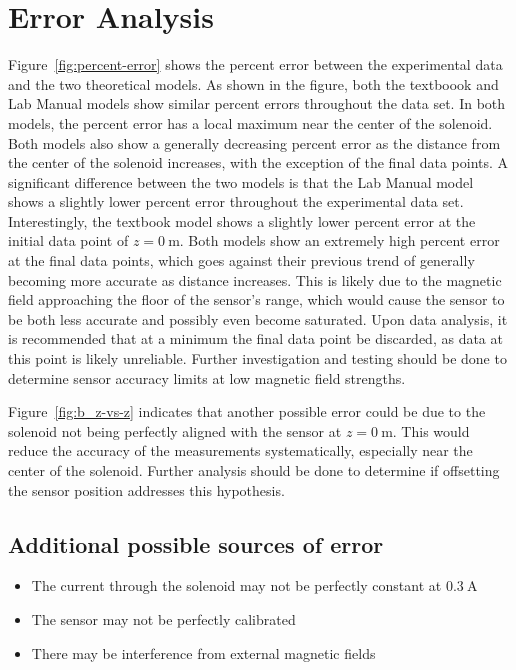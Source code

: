 \documentclass[11pt]{article}
\begin{document}
\section{Error Analysis}
Figure~\ref{fig:percent-error} shows the percent error between the experimental data and the two theoretical models.
As shown in the figure, both the textboook and Lab Manual models show similar percent errors throughout the data set.
In both models, the percent error has a local maximum near the center of the solenoid.
Both models also show a generally decreasing percent error as the distance from the center of the solenoid increases, with the exception of the final data points.
A significant difference between the two models is that the Lab Manual model shows a slightly lower percent error throughout the experimental data set.
Interestingly, the textbook model shows a slightly lower percent error at the initial data point of $z=\SI{0}{\meter}$.
Both models show an extremely high percent error at the final data points, which goes against their previous trend of generally becoming more accurate as distance increases.
This is likely due to the magnetic field approaching the floor of the sensor's range, which would cause the sensor to be both less accurate and possibly even become saturated.
Upon data analysis, it is recommended that at a minimum the final data point be discarded, as data at this point is likely unreliable.
Further investigation and testing should be done to determine sensor accuracy limits at low magnetic field strengths.

Figure~\ref{fig:b_z-vs-z} indicates that another possible error could be due to the solenoid not being perfectly aligned with the sensor at $z=\SI{0}{\meter}$.
This would reduce the accuracy of the measurements systematically, especially near the center of the solenoid.
Further analysis should be done to determine if offsetting the sensor position addresses this hypothesis.

\subsection*{Additional possible sources of error}
\begin{itemize}
    \item The current through the solenoid may not be perfectly constant at $\SI{0.3}{\ampere}$
    \item The sensor may not be perfectly calibrated
    \item There may be interference from external magnetic fields
\end{itemize}
\end{document}
